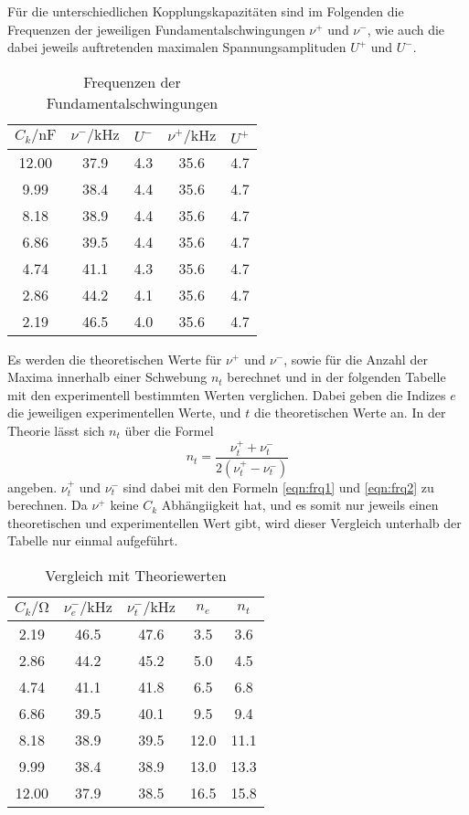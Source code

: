 Für die unterschiedlichen Kopplungskapazitäten sind im Folgenden die Frequenzen der jeweiligen
Fundamentalschwingungen $\nu^+$ und $\nu^-$, wie auch die dabei jeweils auftretenden maximalen
Spannungsamplituden $U^+$ und $U^-$.
\begin{table}
    \centering
    \caption{Frequenzen der Fundamentalschwingungen}
    \label{tab:b}
    \begin{tabular}{c c c c c}
    \toprule
    {$C_k / \si{\nano\farad}$} & {$\nu^- / \si{\kilo\hertz}$} & {$U^-$} & {$\nu^+ / \si{\kilo\hertz}$} & {$U^+$} \\
    \midrule
    12.00 & 37.9 & 4.3 & 35.6 & 4.7 \\
     9.99 & 38.4 & 4.4 & 35.6 & 4.7 \\
     8.18 & 38.9 & 4.4 & 35.6 & 4.7 \\
     6.86 & 39.5 & 4.4 & 35.6 & 4.7 \\
     4.74 & 41.1 & 4.3 & 35.6 & 4.7 \\
     2.86 & 44.2 & 4.1 & 35.6 & 4.7 \\
     2.19 & 46.5 & 4.0 & 35.6 & 4.7 \\
     \bottomrule
    \end{tabular}
\end{table}

Es werden die theoretischen Werte für $\nu^+$ und $\nu^-$, sowie für die Anzahl der Maxima innerhalb einer Schwebung $n_t$
berechnet und in der folgenden Tabelle mit den experimentell bestimmten Werten verglichen. Dabei geben die Indizes $e$ die jeweiligen
experimentellen Werte, und $t$ die theoretischen Werte an. 
In der Theorie lässt sich $n_t$ über die Formel \begin{equation}
    n_t = \frac{\nu_{t}^{+} + \nu_{t}^{-}}{2(\nu_{t}^{+} - \nu_{t}^{-})}
\end{equation}
angeben. $\nu_{t}^{+}$ und $\nu_{t}^{-}$ sind dabei mit den Formeln \ref{eqn:frq1} und \ref{eqn:frq2} zu berechnen.
Da $\nu^+$ keine $C_k$ Abhängiigkeit hat, und es somit nur jeweils einen theoretischen und experimentellen Wert gibt, wird
dieser Vergleich unterhalb der Tabelle nur einmal aufgeführt.
\begin{table}
    \centering
    \caption{Vergleich mit Theoriewerten}
    \label{tab:theo}
    \begin{tabular}{c c c c c}
    \toprule
    $C_k / \si{\ohm}$ & $\nu_{e}^- / \si{\kilo\hertz}$ & $\nu_{t}^- / \si{\kilo\hertz}$ & $n_e$ & $n_t$ \\
    \midrule
     2.19 & 46.5 & 47.6 &  3.5 &  3.6 \\
     2.86 & 44.2 & 45.2 &  5.0 &  4.5 \\
     4.74 & 41.1 & 41.8 &  6.5 &  6.8 \\
     6.86 & 39.5 & 40.1 &  9.5 &  9.4 \\
     8.18 & 38.9 & 39.5 & 12.0 & 11.1 \\
     9.99 & 38.4 & 38.9 & 13.0 & 13.3 \\
    12.00 & 37.9 & 38.5 & 16.5 & 15.8 \\
    \bottomrule
    \end{tabular}
\end{table}

